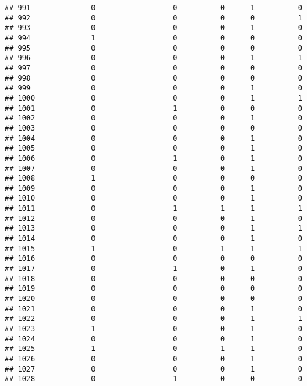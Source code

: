 \documentclass[
]{article}
\begin{document}
\begin{verbatim}
## 991              0                  0          0      1          0
## 992              0                  0          0      0          1
## 993              0                  0          0      1          0
## 994              1                  0          0      0          0
## 995              0                  0          0      0          0
## 996              0                  0          0      1          1
## 997              0                  0          0      0          0
## 998              0                  0          0      0          0
## 999              0                  0          0      1          0
## 1000             0                  0          0      1          1
## 1001             0                  1          0      0          0
## 1002             0                  0          0      1          0
## 1003             0                  0          0      0          0
## 1004             0                  0          0      1          0
## 1005             0                  0          0      1          0
## 1006             0                  1          0      1          0
## 1007             0                  0          0      1          0
## 1008             1                  0          0      0          0
## 1009             0                  0          0      1          0
## 1010             0                  0          0      1          0
## 1011             0                  1          1      1          1
## 1012             0                  0          0      1          0
## 1013             0                  0          0      1          1
## 1014             0                  0          0      1          0
## 1015             1                  0          1      1          1
## 1016             0                  0          0      0          0
## 1017             0                  1          0      1          0
## 1018             0                  0          0      0          0
## 1019             0                  0          0      0          0
## 1020             0                  0          0      0          0
## 1021             0                  0          0      1          0
## 1022             0                  0          0      1          1
## 1023             1                  0          0      1          0
## 1024             0                  0          0      1          0
## 1025             1                  0          1      1          0
## 1026             0                  0          0      1          0
## 1027             0                  0          0      1          0
## 1028             0                  1          0      0          0

\end{verbatim}
\end{document}

